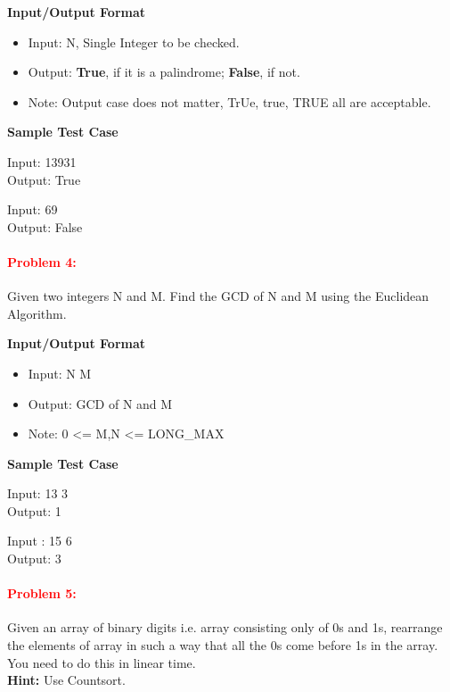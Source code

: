 \documentclass[a4paper,11pt]{article} %
\begin{document}
\textbf{Input/Output Format}
\begin{itemize}
    \item  Input: N, Single Integer to be checked.
    \item  Output: \textbf{True}, if it is a palindrome; \textbf{False}, if not.
    \item  Note: Output case does not matter, TrUe, true, TRUE all are acceptable.
\end{itemize}


\textbf{Sample Test Case}

Input:  13931\\
Output: True
\vspace*{0.3cm}

Input: 69\\
Output: False
\vspace*{0.3cm}

\paragraph{\textcolor{red}{Problem 4:}}
Given two integers N and M. Find the GCD of N and M using the Euclidean Algorithm.

\textbf{Input/Output Format}
\begin{itemize}
    \item  Input: N M
    \item  Output: GCD of N and M
    \item  Note: 0 <= M,N <= LONG\_MAX
\end{itemize}

\textbf{Sample Test Case}

Input:  13 3\\
Output: 1
\vspace*{0.5cm}

Input : 15 6\\
Output: 3
\vspace*{0.5cm}


\newpage
\paragraph{\textcolor{red}{Problem 5:}}
Given an array of binary digits i.e. array consisting only of 0s and 1s, rearrange the elements of array in such a way that all the 0s come before 1s in the array. You need to do this in linear time.\\
\textbf{Hint: } Use Countsort.
\end{document}
